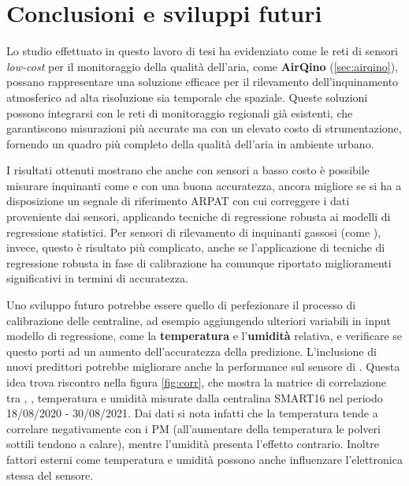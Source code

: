 \chapter*{Conclusioni e sviluppi futuri}\label{ch:conclusioni}
Lo studio effettuato in questo lavoro di tesi ha evidenziato come le reti di sensori \textit{low-cost} per il monitoraggio della qualità dell'aria, come \textbf{AirQino} (\ref{sec:airqino}), possano rappresentare una soluzione efficace per il rilevamento dell'inquinamento atmosferico ad alta risoluzione sia temporale che spaziale. Queste soluzioni possono integrarsi con le reti di monitoraggio regionali già esistenti, che garantiscono misurazioni più accurate ma con un elevato costo di strumentazione, fornendo un quadro più completo della qualità dell'aria in ambiente urbano.

I risultati ottenuti mostrano che anche con sensori a basso costo è possibile misurare inquinanti come  e  con una buona accuratezza, ancora migliore se si ha a disposizione un segnale di riferimento ARPAT con cui correggere i dati proveniente dai sensori, applicando tecniche di regressione robusta ai modelli di regressione statistici. Per sensori di rilevamento di inquinanti gassosi (come ), invece, questo è risultato più complicato, anche se l'applicazione di tecniche di regressione robusta in fase di calibrazione ha comunque riportato miglioramenti significativi in termini di accuratezza.

Uno sviluppo futuro potrebbe essere quello di perfezionare il processo di calibrazione delle centraline, ad esempio aggiungendo ulteriori variabili in input modello di regressione, come la \textbf{temperatura} e l'\textbf{umidità} relativa, e verificare se questo porti ad un aumento dell'accuratezza della predizione. L'inclusione di nuovi predittori potrebbe migliorare anche la performance sul sensore di .
 Questa idea trova riscontro nella figura \ref{fig:corr}, che mostra la matrice di correlazione tra , , temperatura e umidità misurate dalla centralina SMART16 nel periodo 18/08/2020 - 30/08/2021. Dai dati si nota infatti che la temperatura tende a correlare negativamente con i PM (all'aumentare della temperatura le polveri sottili tendono a calare), mentre l'umidità presenta l'effetto contrario. Inoltre fattori esterni come temperatura e umidità possono anche influenzare l'elettronica stessa del sensore.

